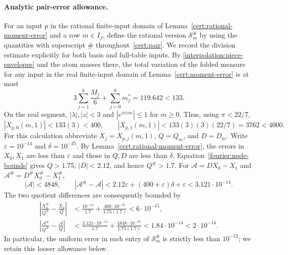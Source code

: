 \paragraph{Analytic pair-error allowance.}
For an input $p$ in the rational finite-input domain of
Lemma~\ref{cert:rational-moment-error} and a row $m\in I_f$, define the rational
version $\mathcal S_m^\#$ by using the quantities with superscript $\#$
throughout~\eqref{cert:pair}.  We record the division estimate explicitly
for both basis and full-table inputs.  By
\eqref{interpolation:piece-envelopes} and the atom masses there, the total
variation of the folded measure for any input in the real finite-input
domain of Lemma~\ref{cert:moment-error} is at most
\[
 3\sum_{j=1}^6\frac{M_j}{6}+\sum_{j=0}^6m_j^*=119.642<133.
\]
On the real segment, $|\lambda|,|z|<3$ and
$|e^{i\pi z m}|\le1$ for $m\ge0$.  Thus, using $\pi<22/7$,
\[
 |X_{p,0}(m,1)|<133(3)<400,\qquad
 |X_{p,1}(m,1)|<133(3)(3)(22/7)=3762<4000.
\]
For this calculation abbreviate $X_j=X_{p,j}(m,1)$, $Q=Q_m$, and $D=D_m$.
Write $\varepsilon=10^{-14}$ and $\delta=10^{-25}$.  By
Lemma~\ref{cert:rational-moment-error}, the errors in $X_0,X_1$ are less than
$\varepsilon$ and those in $Q,D$ are less than $\delta$.
Equation~\eqref{fourier:node-bounds} gives $Q>1.75$, $|D|<2.12$, and hence
$Q^{\#}>1.7$.  For $\mathcal A=DX_0-X_1$ and
$\mathcal A^{\#}=D^{\#}X_0^{\#}-X_1^{\#}$,
\[
 |\mathcal A|<4848,\qquad
 |\mathcal A^{\#}-\mathcal A|<2.12\varepsilon+(400+\varepsilon)\delta+\varepsilon
             <3.121\cdot10^{-14}.
\]
The two quotient differences are consequently bounded by
\[
\begin{aligned}
 \left|\frac{X_0^{\#}}{Q^{\#}}-\frac{X_0}{Q}\right|
 &<\frac{10^{-14}}{1.7}+\frac{400\cdot10^{-25}}{1.75(1.7)}
   <6\cdot10^{-15},\\
 \left|\frac{\mathcal A^{\#}}{Q^{\#}}-\frac{\mathcal A}{Q}\right|
 &<\frac{3.121\cdot10^{-14}}{1.7}
   +\frac{4848\cdot10^{-25}}{1.75(1.7)}
   <1.84\cdot10^{-14}<2\cdot10^{-14}.
\end{aligned}
\]
In particular, the uniform error in each entry of $\mathcal S_m^{\#}$ is
strictly less than $10^{-12}$; we retain this looser allowance below.

